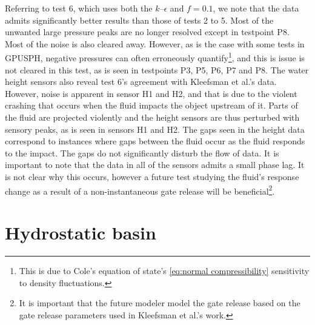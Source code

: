 \documentclass{../GPUSPHtemplate}
\begin{document}
Referring to test 6, which uses both the $k$--$\epsilon$ and $f=0.1$, we note that the data admits significantly better results than those of tests 2 to 5. Most of the unwanted large pressure peaks are no longer resolved except in testpoint P8. Most of the noise is also cleared away. However, as is the case with some tests in GPUSPH, negative pressures can often erroneously quantify\footnote{This is due to Cole's equation of state's \ref{eq:normal compressibility} sensitivity to density fluctuations.}, and this is issue is not cleared in this test, as is seen in testpoints P3, P5, P6, P7 and P8. The water height sensors also reveal test 6's agreement with Kleefsman et al.'s data. However, noise is apparent in sensor H1 and H2, and that is due to the violent crashing that occurs when the fluid impacts the object upstream of it. Parts of the fluid are projected violently and the height sensors are thus perturbed with sensory peaks, as is seen in sensors H1 and H2. The gaps seen in the height data correspond to instances where gaps between the fluid occur as the fluid responds to the impact. The gaps do not significantly disturb the flow of data. It is important to note that the data in all of the sensors admits a small phase lag. It is not clear why this occurs, however a future test studying the fluid's response change as a result of a non-instantaneous gate release will be beneficial\footnote{It is important that the future modeler model the gate release based on the gate release parameters used in Kleefsman et al.'s work.}.  

\section{Hydrostatic basin}
\end{document}
